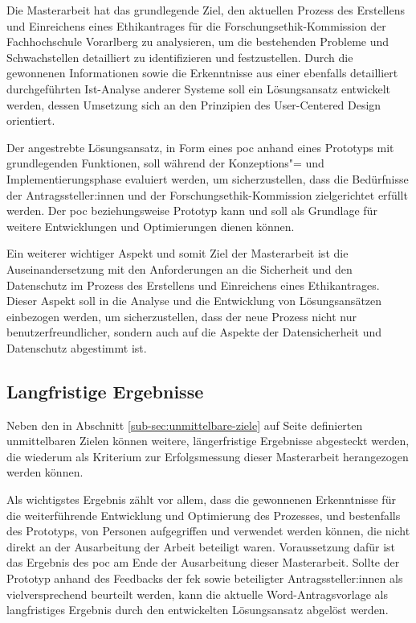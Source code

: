 \documentclass[a4paper,12pt,twoside]{scrreprt}
\begin{document}
Die Masterarbeit hat das grundlegende Ziel, den aktuellen Prozess des Erstellens und Einreichens eines Ethikantrages für die Forschungsethik-Kommission der Fachhochschule Vorarlberg zu analysieren, um die bestehenden Probleme und Schwachstellen detailliert zu identifizieren und festzustellen. Durch die gewonnenen Informationen sowie die Erkenntnisse aus einer ebenfalls detailliert durchgeführten Ist-Analyse anderer Systeme soll ein Lösungsansatz entwickelt werden, dessen Umsetzung sich an den Prinzipien des User-Centered Design orientiert.

Der angestrebte Lösungsansatz, in Form eines \ac{poc} anhand eines Prototyps mit grundlegenden Funktionen, soll während der Konzeptions"= und Implementierungsphase evaluiert werden, um sicherzustellen, dass die Bedürfnisse der Antragssteller:innen und der Forschungsethik-Kommission zielgerichtet erfüllt werden. Der \ac{poc} beziehungsweise Prototyp kann und soll als Grundlage für weitere Entwicklungen und Optimierungen dienen können.

Ein weiterer wichtiger Aspekt und somit Ziel der Masterarbeit ist die Auseinandersetzung mit den Anforderungen an die Sicherheit und den Datenschutz im Prozess des Erstellens und Einreichens eines Ethikantrages. Dieser Aspekt soll in die Analyse und die Entwicklung von Lösungsansätzen einbezogen werden, um sicherzustellen, dass der neue Prozess nicht nur benutzerfreundlicher, sondern auch auf die Aspekte der Datensicherheit und Datenschutz abgestimmt ist.

\subsection{Langfristige Ergebnisse}
\label{sub-sec:langfristige-ergebnisse}

Neben den in Abschnitt \ref{sub-sec:unmittelbare-ziele} auf Seite \pageref{sub-sec:unmittelbare-ziele} definierten unmittelbaren Zielen können weitere, längerfristige Ergebnisse abgesteckt werden, die wiederum als Kriterium zur Erfolgsmessung dieser Masterarbeit herangezogen werden können.

Als wichtigstes Ergebnis zählt vor allem, dass die gewonnenen Erkenntnisse für die weiterführende Entwicklung und Optimierung des Prozesses, und bestenfalls des Prototyps, von Personen aufgegriffen und verwendet werden können, die nicht direkt an der Ausarbeitung der Arbeit beteiligt waren. Voraussetzung dafür ist das Ergebnis des \ac{poc} am Ende der Ausarbeitung dieser Masterarbeit. Sollte der Prototyp anhand des Feedbacks der \acl{fek} sowie beteiligter Antragssteller:innen als vielversprechend beurteilt werden, kann die aktuelle Word-Antragsvorlage als langfristiges Ergebnis durch den entwickelten Lösungsansatz abgelöst werden.
\end{document}
